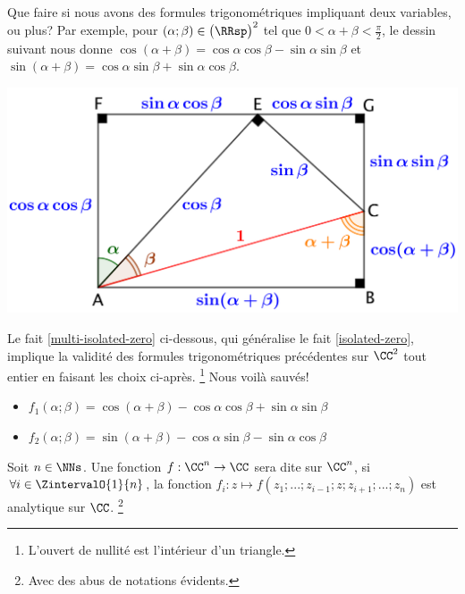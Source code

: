 Que faire si nous avons des formules trigonométriques impliquant deux variables, ou plus?
Par exemple,
pour
$(\alpha ; \beta) \in \big( \RRsp \big)^2$ tel que $0 < \alpha + \beta < \frac{\pi}{2}$,
le dessin suivant nous donne
$\cos(\alpha + \beta) = \cos \alpha \cos \beta - \sin \alpha \sin \beta$
et
$\sin(\alpha + \beta) = \cos \alpha \sin \beta + \sin \alpha \cos \beta$. 

\begin{center}
	\includegraphics[scale=.7]{two-var-trig-formulas.png}
\end{center}

Le fait \ref{multi-isolated-zero} ci-dessous, qui généralise le fait \ref{isolated-zero}, implique la validité des formules trigonométriques précédentes sur $\CC^2$ tout entier en faisant les choix ci-après.%
\footnote{
    L'ouvert de nullité est l'intérieur d'un triangle.
}
Nous voilà sauvés!
%
\begin{itemize}[label=\small\textbullet]
	\item $f_1(\alpha ; \beta) = \cos(\alpha + \beta) - \cos \alpha \cos \beta + \sin \alpha \sin \beta$

	\item $f_2(\alpha ; \beta) = \sin(\alpha + \beta) - \cos \alpha \sin \beta - \sin \alpha \cos \beta$
\end{itemize}




\begin{defi}
    Soit $n \in \NNs$.
    Une fonction $f: \CC^n \rightarrow \CC$ sera dite  sur $\CC^n$,
    si $\forall i \in \ZintervalO{1}{n}$, 
	la fonction $f_i: z \mapsto f(z_1 ; ... ; z_{i-1} ; z ; z_{i+1} ; ... ; z_n)$ est analytique sur $\CC$.%
	\footnote{
		Avec des abus de notations évidents.
	}
\end{defi}


